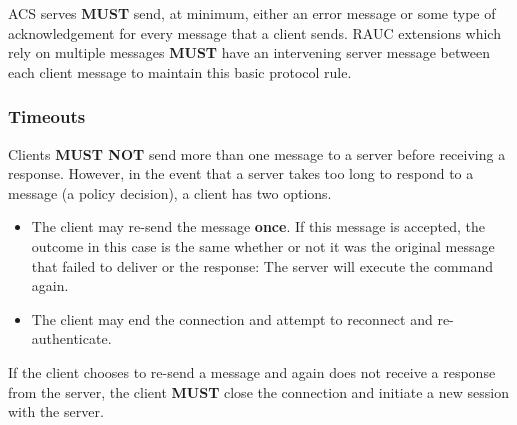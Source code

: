 ACS serves \textbf{MUST} send, at minimum, either an error message or some type of acknowledgement for every message that a client sends. RAUC extensions which rely on multiple messages \textbf{MUST} have an intervening server message between each client message to maintain this basic protocol rule. 

\subsubsection{Timeouts}
Clients \textbf{MUST NOT} send more than one message to a server before receiving a response. However, in the event that a server takes too long to respond to a message (a policy decision), a client has two options.
\begin{itemize}
\item{The client may re-send the message \textbf{once}. If this message is accepted, the outcome in this case is the same whether or not it was the original message that failed to deliver or the response: The server will execute the command again.}
\item{The client may end the connection and attempt to reconnect and re-authenticate.}
\end{itemize}

If the client chooses to re-send a message and again does not receive a response from the server, the client \textbf{MUST} close the connection and initiate a new session with the server.

